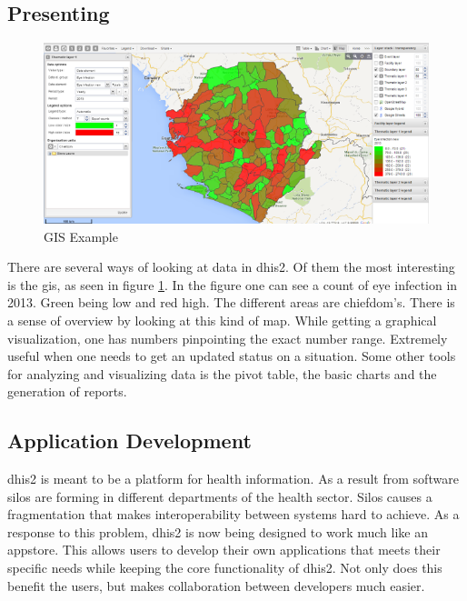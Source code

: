 \subsection{Presenting}
\begin{figure}
\centering
\includegraphics[width=\columnwidth]{context/img/gisExample}
\caption{GIS Example}
\label{fig:gis}
\end{figure}
There are several ways of looking at data in \gls{dhis2}. 
Of them the most interesting is the \gls{gis}, as seen in figure \ref{fig:gis}. 
In the figure one can see a count of eye infection in 2013.
Green being low and red high. The different areas are chiefdom’s.
There is a sense of overview by looking at this kind of map. 
While getting a graphical visualization, one has numbers pinpointing the exact number range. 
Extremely useful when one needs to get an updated status on a situation. 
Some other tools for analyzing and visualizing data is the pivot table, the basic charts and the generation of reports.

\subsection{Application Development}
\gls{dhis2} is meant to be a platform for health information. 
As a result from software silos are forming in different departments of the health sector. 
Silos causes a fragmentation that makes interoperability between systems hard to achieve. 
As a response to this problem, \gls{dhis2} is now being designed to work much like an appstore. 
This allows users to develop their own applications that meets their specific needs while keeping the core functionality of \gls{dhis2}. 
Not only does this benefit the users, but makes collaboration between developers much easier. 



\cite{countries:dhis2org}
\cite{internet:stats}

